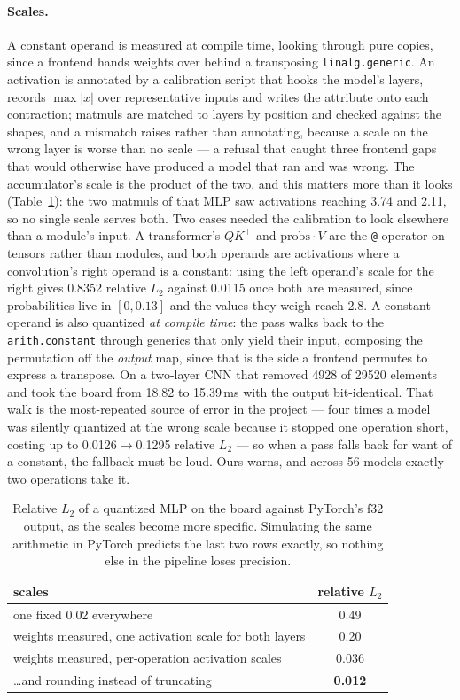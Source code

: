 \documentclass[runningheads]{llncs}
\begin{document}
\paragraph{Scales.} A constant operand is measured at compile time, looking
through pure copies, since a frontend hands weights over behind a transposing
\texttt{linalg.generic}. An activation is annotated by a calibration script that
hooks the model's layers, records $\max|x|$ over representative inputs and writes
the attribute onto each contraction; matmuls are matched to layers by position and
checked against the shapes, and a mismatch raises rather than annotating, because
a scale on the wrong layer is worse than no scale --- a refusal that caught three
frontend gaps that would otherwise have produced a model that ran and was wrong.
The accumulator's scale is the product of the two, and this matters more than it
looks (Table~\ref{tab:scales}): the two matmuls of that MLP saw activations
reaching 3.74 and 2.11, so no single scale serves both. Two cases needed the calibration to
look elsewhere than a module's input. A transformer's $QK^{\!\top}$ and
$\mathrm{probs}\cdot V$ are the \texttt{@} operator on tensors rather than
modules, and both operands are activations where a convolution's right operand is
a constant: using the left operand's scale for the right gives 0.8352 relative
$L_2$ against 0.0115 once both are measured, since probabilities live in
$[0,0.13]$ and the values they weigh reach 2.8. A constant operand is also quantized \emph{at compile time}: the pass walks back
to the \texttt{arith.constant} through generics that only yield their input,
composing the permutation off the \emph{output} map, since that is the side a
frontend permutes to express a transpose. On a two-layer CNN that removed 4928 of
29520 elements and took the board from 18.82 to 15.39\,ms with the output
bit-identical. That walk is the most-repeated source of error in the project ---
four times a model was silently quantized at the wrong scale because it stopped
one operation short, costing up to 0.0126$\to$0.1295 relative $L_2$ --- so when a
pass falls back for want of a constant, the fallback must be loud. Ours warns, and
across 56 models exactly two operations take it.

\begin{table}[t]
\caption{Relative $L_2$ of a quantized MLP on the board against PyTorch's f32
output, as the scales become more specific. Simulating the same arithmetic in
PyTorch predicts the last two rows exactly, so nothing else in the pipeline loses
precision.}\label{tab:scales}
\centering
\footnotesize
\begin{tabular}{|l|c|}
\hline
scales & relative $L_2$ \\
\hline
one fixed 0.02 everywhere & 0.49 \\
weights measured, one activation scale for both layers & 0.20 \\
weights measured, per-operation activation scales & 0.036 \\
\ldots{}and rounding instead of truncating & \textbf{0.012} \\
\hline
\end{tabular}
\end{table}
\end{document}
